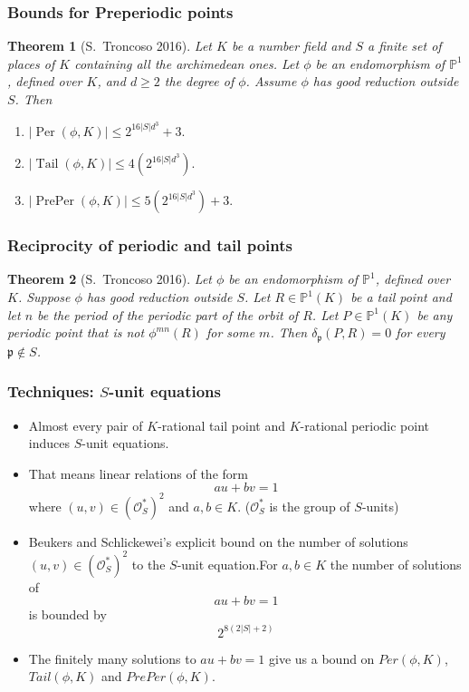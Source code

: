 \documentclass{beamer}
\def\PP{{\mathbb P}}
\def\pp{{\mathfrak p}}
\DeclareMathOperator{\Tail}{Tail}
\DeclareMathOperator{\Per}{Per}
\DeclareMathOperator{\PrePer}{PrePer}
\theoremstyle{thmstyle}
\newtheorem*{mythm}{Theorem}
\theoremstyle{mystyle}
\theoremstyle{qstnstyle}
\begin{document}
\begin{frame}
\frametitle{Bounds for Preperiodic points}
\begin{mythm}[S.\ Troncoso 2016]
Let $K$ be a number field and $S$ a finite set of places of $K$ containing all the archimedean ones. Let $\phi $ be an endomorphism of $\PP^1$, defined over $K$, and $d \geq 2$ the degree of $\phi$. Assume $\phi$ has  good reduction outside $S$. Then
\begin{enumerate}
\item [(a)] $|\Per(\phi,K)| \leq  2^{16|S|d^3}+3.$

\item [(b)] $|\Tail(\phi,K)| \leq  4(2^{16|S|d^3}) .$

\item [(c)] $|\PrePer(\phi,K)| \leq 5(2^{16|S|d^3})+3.$

\end{enumerate}
\end{mythm}
\end{frame}

\begin{frame}
\frametitle{Reciprocity of periodic and tail points}
\begin{mythm}[S.\ Troncoso 2016]
Let $\phi$ be an endomorphism of $\PP^1$, defined over $K$. Suppose $\phi$ has good reduction outside $S$. Let $R\in\PP^1(K)$ be a tail point and let $n$ be the period of the periodic part of the orbit of $R$. Let $P\in\PP^1(K)$ be any periodic point that is not $\phi^{mn}(R)$ for some $m$. Then $\delta_\pp(P,R)=0$ for every $\pp \notin S$.
\end{mythm}
\end{frame}

\begin{frame}
\frametitle{Techniques: $S$-unit equations}

\begin{itemize}
\item Almost every pair of $K$-rational tail point and $K$-rational periodic point induces $S$-unit equations. \pause
\item That means linear relations of the form $$au+bv=1$$  where  $(u,v) \in \left(\mathcal{O}_S^*\right)^2$ and $a,b\in{K}$. ($\mathcal{O}_S^{*}$ is the group of $S$-units) \pause
\item Beukers and Schlickewei's explicit bound on the number of solutions $(u,v) \in \left(\mathcal{O}_S^{*}\right)^2$ to the $S$-unit equation.\pause For $a,b\in{K}$ the number of solutions of $$au+bv=1$$ is bounded by $$2^{8(2|S|+2)}$$ \pause
\item The finitely many solutions to $au+bv=1$ give us a bound on $Per(\phi,K)$, $Tail(\phi,K)$ and $PrePer(\phi,K)$. 
\end{itemize}
\end{frame}
\end{document}

